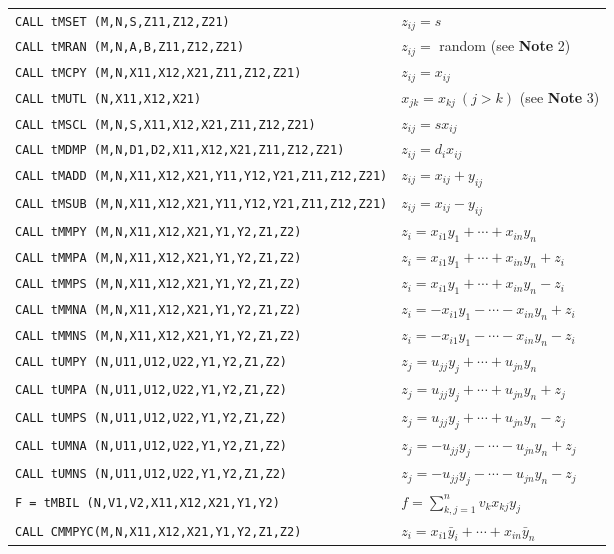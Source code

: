 \begin{flushleft}
\begin{htmlonly}
\begin{tabular}{ll}
{\tt CALL tMSET (M,N,S,Z11,Z12,Z21)} & $z_{ij}=s$ \\
{\tt CALL tMRAN (M,N,A,B,Z11,Z12,Z21)} & $z_{ij} =$ random
(see {\bf Note} 2)\\
{\tt CALL tMCPY (M,N,X11,X12,X21,Z11,Z12,Z21)} & $z_{ij}=x_{ij}$ \\
{\tt CALL tMUTL (N,X11,X12,X21)} &
$x_{jk} = x_{kj} \ (j>k)$ (see {\bf Note} 3) \\
{\tt CALL tMSCL (M,N,S,X11,X12,X21,Z11,Z12,Z21)} & $z_{ij}=sx_{ij}$ \\
{\tt CALL tMDMP (M,N,D1,D2,X11,X12,X21,Z11,Z12,Z21)} &
$z_{ij}=d_ix_{ij}$ \\
{\tt CALL tMADD (M,N,X11,X12,X21,Y11,Y12,Y21,Z11,Z12,Z21)} &
$z_{ij}=x_{ij}+y_{ij}$ \\
{\tt CALL tMSUB (M,N,X11,X12,X21,Y11,Y12,Y21,Z11,Z12,Z21)} &
$z_{ij}=x_{ij}-y_{ij}$ \\
{\tt CALL tMMPY (M,N,X11,X12,X21,Y1,Y2,Z1,Z2)} &
$z_i=x_{i1}y_1+\cdots+x_{in}y_n$ \\
{\tt CALL tMMPA (M,N,X11,X12,X21,Y1,Y2,Z1,Z2)} &
$z_i=x_{i1}y_1+\cdots+x_{in}y_n+z_i$ \\
{\tt CALL tMMPS (M,N,X11,X12,X21,Y1,Y2,Z1,Z2)} &
$z_i=x_{i1}y_1+\cdots+x_{in}y_n-z_i$ \\
{\tt CALL tMMNA (M,N,X11,X12,X21,Y1,Y2,Z1,Z2)} &
$z_i=-x_{i1}y_1-\cdots-x_{in}y_n+z_i$ \\
{\tt CALL tMMNS (M,N,X11,X12,X21,Y1,Y2,Z1,Z2)} &
$z_i=-x_{i1}y_1-\cdots-x_{in}y_n-z_i$ \\
{\tt CALL tUMPY (N,U11,U12,U22,Y1,Y2,Z1,Z2)} &
$z_j=u_{jj}y_j+\cdots+u_{jn}y_n$ \\
{\tt CALL tUMPA (N,U11,U12,U22,Y1,Y2,Z1,Z2)} &
$z_j=u_{jj}y_j+\cdots+u_{jn}y_n+z_j$ \\
{\tt CALL tUMPS (N,U11,U12,U22,Y1,Y2,Z1,Z2)} &
$z_j=u_{jj}y_j+\cdots+u_{jn}y_n-z_j$ \\
{\tt CALL tUMNA (N,U11,U12,U22,Y1,Y2,Z1,Z2)} &
$z_j=-u_{jj}y_j-\cdots-u_{jn}y_n+z_j$ \\
{\tt CALL tUMNS (N,U11,U12,U22,Y1,Y2,Z1,Z2)} &
$z_j=-u_{jj}y_j-\cdots-u_{jn}y_n-z_j$ \\
{\tt F =  tMBIL (N,V1,V2,X11,X12,X21,Y1,Y2)} &
$f = \sum_{k,j = 1}^n v_kx_{kj}y_j$ \\
{\tt CALL CMMPYC(M,N,X11,X12,X21,Y1,Y2,Z1,Z2)} &
$z_i=x_{i1}\bar{y}_i+\cdots+x_{in}\bar{y}_n$ \\

\end{tabular}
\end{htmlonly}
\end{flushleft}
